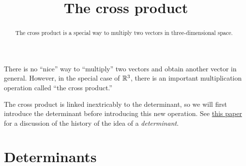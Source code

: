 \documentclass{ximera}
\title[Dig-In:]{The cross product}
\begin{document}
\begin{abstract}
  The cross product is a special way to multiply two vectors in
  three-dimensional space.
\end{abstract}
\maketitle

There is no ``nice'' way to ``multiply'' two vectors and obtain
another vector in general. However, in the special case of $\mathbb R^3$,
there is an important multiplication operation called ``the cross
product.''

The cross product is linked inextricably to the determinant, so we
will first introduce the determinant before introducing this new
operation. See \href{http://www-groups.dcs.st-and.ac.uk/history/HistTopics/Matrices_and_determinants.html}{this paper}
for a discussion of the history of the idea of a \textit{determinant}.


\section{Determinants}
\end{document}
